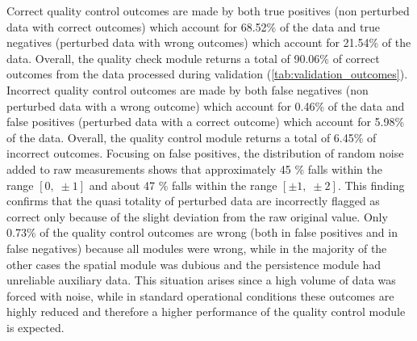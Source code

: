 \documentclass[authoryear,preprint,review,12pt]{elsarticle}
\begin{document}
Correct quality control outcomes are made by both true positives (non perturbed data with correct outcomes) which account for 68.52\% of the data and true negatives (perturbed data with wrong outcomes) which account for 21.54\% of the data. 
Overall, the quality check module returns a total of 90.06\% of correct outcomes from the data processed during validation (\cref{tab:validation_outcomes}).
Incorrect quality control outcomes are made by both false negatives (non perturbed data with a wrong outcome) which account for 0.46\% of the data and false positives (perturbed data with a correct outcome) which account for 5.98\% of the data. 
Overall, the quality control module returns a total of 6.45\% of incorrect outcomes. 
Focusing on false positives, the distribution of random noise added to raw measurements shows that approximately 45 \% falls within the range $[0,\; \pm1]$ and about 47 \% falls within the range $[\pm1,\; \pm2]$. 
This finding confirms that the quasi totality of perturbed data are incorrectly flagged as correct only because of the slight deviation from the raw original value.
Only 0.73\% of the quality control outcomes are wrong (both in false positives and in false negatives) because all modules were wrong, while in the majority of the other cases the spatial module was dubious and the persistence module had unreliable auxiliary data.
This situation arises since a high volume of data was forced with noise, while in standard operational conditions these outcomes are highly reduced and therefore a higher performance of the quality control module is expected.
\end{document}

